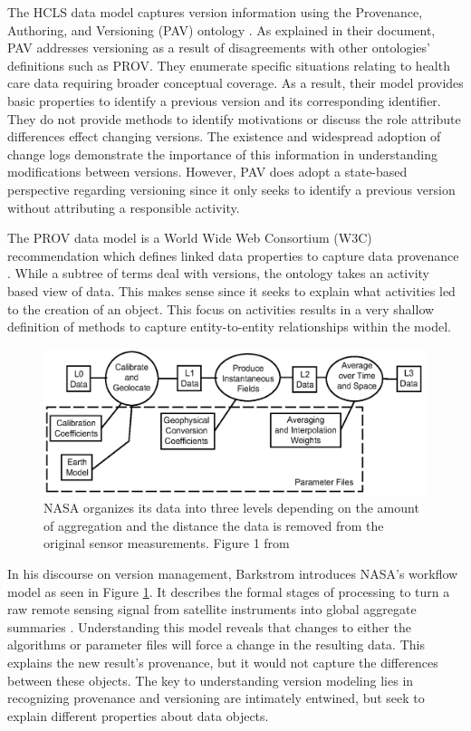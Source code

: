 The HCLS data model captures version information using the Provenance, Authoring, and Versioning (PAV) ontology \cite{Ciccarese2013}.
As explained in their document, PAV addresses versioning as a result of disagreements with other ontologies' definitions such as PROV.
They enumerate specific situations relating to health care data requiring broader conceptual coverage.
As a result, their model provides basic properties to identify a previous version and its corresponding identifier.
They do not provide methods to identify motivations or discuss the role attribute differences effect changing versions.
The existence and widespread adoption of change logs demonstrate the importance of this information in understanding modifications between versions.
However, PAV does adopt a state-based perspective regarding versioning since it only seeks to identify a previous version without attributing a responsible activity.

The PROV data model is a World Wide Web Consortium (W3C) recommendation which defines linked data properties to capture data provenance \cite{Gil2013}.
While a subtree of terms deal with versions, the ontology takes an activity based view of data.
This makes sense since it seeks to explain what activities led to the creation of an object.
This focus on activities results in a very shallow definition of methods to capture entity-to-entity relationships within the model.

\begin{figure}
	\centering
	\includegraphics[scale=0.35]{figures/NASALevels.png}
	\caption{NASA organizes its data into three levels depending on the amount of aggregation and the distance the data is removed from the original sensor measurements. Figure 1 from \cite{Barkstrom2003}}
	\label{NASALevels}
\end{figure}

In his discourse on version management, Barkstrom introduces NASA's workflow model as seen in Figure \ref{NASALevels}.
It describes the formal stages of processing to turn a raw remote sensing signal from satellite instruments into global aggregate summaries \cite{Barkstrom2003}.
Understanding this model reveals that changes to either the algorithms or parameter files will force a change in the resulting data.
This explains the new result's provenance, but it would not capture the differences between these objects.
The key to understanding version modeling lies in recognizing provenance and versioning are intimately entwined, but seek to explain different properties about data objects.

